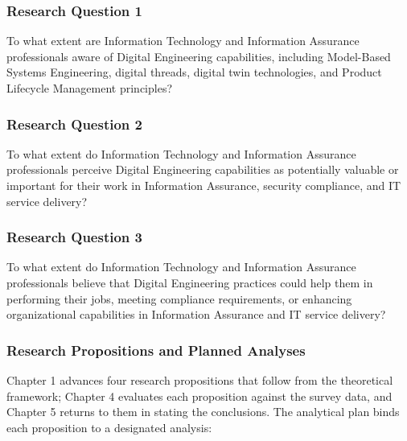 \subsubsection{Research Question 1}

To what extent are Information Technology and Information Assurance professionals aware of Digital Engineering capabilities, including Model-Based Systems Engineering, digital threads, digital twin technologies, and Product Lifecycle Management principles?

\subsubsection{Research Question 2}

To what extent do Information Technology and Information Assurance professionals perceive Digital Engineering capabilities as potentially valuable or important for their work in Information Assurance, security compliance, and IT service delivery?

\subsubsection{Research Question 3}

To what extent do Information Technology and Information Assurance professionals believe that Digital Engineering practices could help them in performing their jobs, meeting compliance requirements, or enhancing organizational capabilities in Information Assurance and IT service delivery?

\subsubsection{Research Propositions and Planned Analyses}

Chapter 1 advances four research propositions that follow from the theoretical framework; Chapter 4 evaluates each proposition against the survey data, and Chapter 5 returns to them in stating the conclusions. The analytical plan binds each proposition to a designated analysis:

